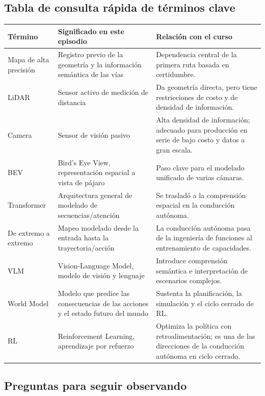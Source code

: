 \documentclass[a4paper]{article}
\begin{document}
\subsection{Tabla de consulta rápida de términos clave}

\noindent\begin{tabularx}{\textwidth}{p{}p{}X}
\toprule
Término & Significado en este episodio & Relación con el curso \\
\midrule
Mapa de alta precisión & Registro previo de la geometría y la información semántica de las vías & Dependencia central de la primera ruta basada en certidumbre. \\
LiDAR & Sensor activo de medición de distancia & Da geometría directa, pero tiene restricciones de costo y de densidad de información. \\
Camera & Sensor de visión pasivo & Alta densidad de información; adecuado para producción en serie de bajo costo y datos a gran escala. \\
BEV & Bird's Eye View, representación espacial a vista de pájaro & Paso clave para el modelado unificado de varias cámaras. \\
Transformer & Arquitectura general de modelado de secuencias/atención & Se trasladó a la comprensión espacial en la conducción autónoma. \\
De extremo a extremo & Mapeo modelado desde la entrada hasta la trayectoria/acción & La conducción autónoma pasa de la ingeniería de funciones al entrenamiento de capacidades. \\
VLM & Vision-Language Model, modelo de visión y lenguaje & Introduce comprensión semántica e interpretación de escenarios complejos. \\
World Model & Modelo que predice las consecuencias de las acciones y el estado futuro del mundo & Sustenta la planificación, la simulación y el ciclo cerrado de RL. \\
RL & Reinforcement Learning, aprendizaje por refuerzo & Optimiza la política con retroalimentación; es una de las direcciones de la conducción autónoma en ciclo cerrado. \\
\bottomrule
\end{tabularx}

\subsection{Preguntas para seguir observando}
\end{document}
